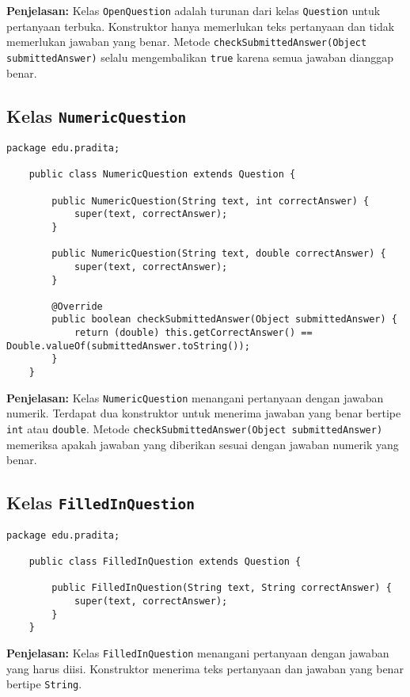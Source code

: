 \textbf{Penjelasan:} Kelas \texttt{OpenQuestion} adalah turunan dari kelas \texttt{Question} untuk pertanyaan terbuka. Konstruktor hanya memerlukan teks pertanyaan dan tidak memerlukan jawaban yang benar. Metode \texttt{checkSubmittedAnswer(Object submittedAnswer)} selalu mengembalikan \texttt{true} karena semua jawaban dianggap benar.

\subsection{Kelas \texttt{NumericQuestion}}

\begin{lstlisting}[style=JavaStyle]
	package edu.pradita;
	
	public class NumericQuestion extends Question {
		
		public NumericQuestion(String text, int correctAnswer) {
			super(text, correctAnswer);
		}
		
		public NumericQuestion(String text, double correctAnswer) {
			super(text, correctAnswer);
		}
		
		@Override
		public boolean checkSubmittedAnswer(Object submittedAnswer) {
			return (double) this.getCorrectAnswer() == Double.valueOf(submittedAnswer.toString());
		}
	}
\end{lstlisting}

\textbf{Penjelasan:} Kelas \texttt{NumericQuestion} menangani pertanyaan dengan jawaban numerik. Terdapat dua konstruktor untuk menerima jawaban yang benar bertipe \texttt{int} atau \texttt{double}. Metode \texttt{checkSubmittedAnswer(Object submittedAnswer)} memeriksa apakah jawaban yang diberikan sesuai dengan jawaban numerik yang benar.

\subsection{Kelas \texttt{FilledInQuestion}}

\begin{lstlisting}[style=JavaStyle]
	package edu.pradita;
	
	public class FilledInQuestion extends Question {
		
		public FilledInQuestion(String text, String correctAnswer) {
			super(text, correctAnswer);
		}
	}
\end{lstlisting}

\textbf{Penjelasan:} Kelas \texttt{FilledInQuestion} menangani pertanyaan dengan jawaban yang harus diisi. Konstruktor menerima teks pertanyaan dan jawaban yang benar bertipe \texttt{String}.

